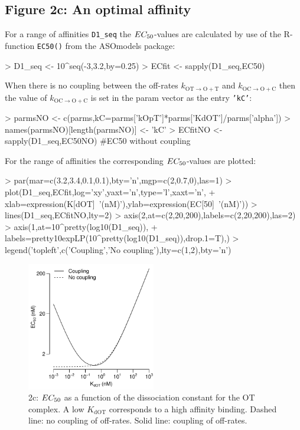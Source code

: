 \documentclass{article}
\newenvironment{Ncenter}{%
  \setlength\topsep{-10pt}
  \setlength\parskip{-100pt}
  \begin{center}
}{%
  \end{center}
}
\newcommand{\kmo}{k_{\mathrm{OT \to O+T}}}
\newcommand{\kD}{k_{\mathrm{OC \to O+C}}}
\newcommand{\EC}{EC_{\rm{50}}}
\newcommand{\KdOT}{K_{\mathrm{dOT}}}
\begin{document}
\subsection*{Figure 2c: An optimal affinity}
For a range of affinities \texttt{D1\_seq} the $\EC$-values are calculated by use of the R-function \texttt{EC50()} from the ASOmodels package:
\begin{Schunk}
\begin{Sinput}
> D1_seq <- 10^seq(-3,3.2,by=0.25)
> ECfit <- sapply(D1_seq,EC50)
\end{Sinput}
\end{Schunk}
When there is no coupling between the off-rates $\kmo$ and $\kD$ then the value of $\kD$ is set in the param vector as the entry \texttt{'kC'}:
\begin{Schunk}
\begin{Sinput}
> parmsNO <- c(parms,kC=parms['kOpT']*parms['KdOT']/parms['alpha'])
> names(parmsNO)[length(parmsNO)] <- 'kC'
> ECfitNO <- sapply(D1_seq,EC50NO) #EC50 without coupling
\end{Sinput}
\end{Schunk}
For the range of affinities the corresponding $\EC$-values are plotted:
\begin{Schunk}
\begin{Sinput}
> par(mar=c(3.2,3.4,0.1,0.1),bty='n',mgp=c(2,0.7,0),las=1)
> plot(D1_seq,ECfit,log='xy',yaxt='n',type='l',xaxt='n',
+      xlab=expression(K[dOT]~'(nM)'),ylab=expression(EC[50]~'(nM)'))
> lines(D1_seq,ECfitNO,lty=2)
> axis(2,at=c(2,20,200),labels=c(2,20,200),las=2)
> axis(1,at=10^pretty(log10(D1_seq)),
+      labels=pretty10expLP(10^pretty(log10(D1_seq)),drop.1=T),)
> legend('topleft',c('Coupling','No coupling'),lty=c(1,2),bty='n')
\end{Sinput}
\end{Schunk}
\begin{figure}[!h]
\begin{Ncenter}
\includegraphics[width=0.5\textwidth]{Vignette2-Fig3}
\end{Ncenter}
\caption{2c: $\EC$ as a function of the dissociation constant for the OT complex. A low $\KdOT$ corresponds to a high affinity binding. Dashed line: no coupling of off-rates. Solid line: coupling of off-rates.}
\end{figure}
\end{document}
